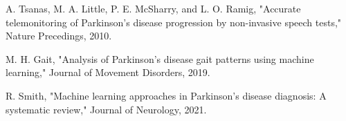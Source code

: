 \documentclass[conference]{IEEEtran}
\begin{document}
\begin{thebibliography}{3}
 A. Tsanas, M. A. Little, P. E. McSharry, and L. O. Ramig, "Accurate telemonitoring of Parkinson's disease progression by non-invasive speech tests," Nature Precedings, 2010.

 M. H. Gait, "Analysis of Parkinson's disease gait patterns using machine learning," Journal of Movement Disorders, 2019.

 R. Smith, "Machine learning approaches in Parkinson's disease diagnosis: A systematic review," Journal of Neurology, 2021.
\end{thebibliography}
\end{document}
